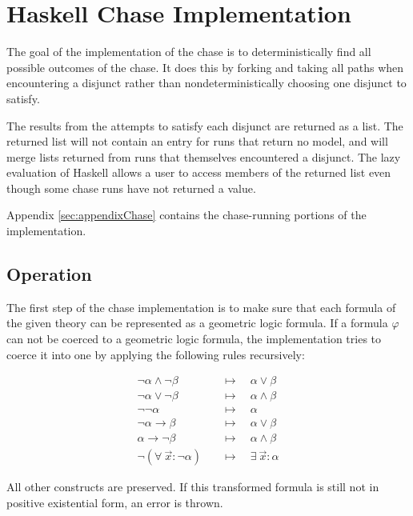 \section{Haskell Chase Implementation}
\label{sec:implementation}

	The goal of the implementation of the chase is to deterministically find
	all possible outcomes of the chase. It does this by forking and taking all
	paths when encountering a disjunct rather than nondeterministically
	choosing one disjunct to satisfy.

	The results from the attempts to satisfy each disjunct are returned as a
	list. The returned list will not contain an entry for runs that return no
	model, and will merge lists returned from runs that themselves encountered
	a disjunct. The lazy evaluation of Haskell allows a user to access members
	of the returned list even though some chase runs have not returned a value.

	Appendix \ref{sec:appendixChase} contains the chase-running portions of the implementation.

	\subsection{Operation}

	The first step of the chase implementation is to make sure that each
	formula of the given theory can be represented as a geometric logic
	formula. If a formula $\varphi$ can not be coerced to a geometric logic
	formula, the implementation tries to coerce it into one by applying the
	following rules recursively:

	\begin{align*}
	\neg\alpha \wedge \neg\beta         \quad & \mapsto \quad \alpha \vee \beta        \\
	\neg\alpha \vee \neg\beta           \quad & \mapsto \quad \alpha \wedge \beta      \\
	\neg\neg\alpha                      \quad & \mapsto \quad \alpha                   \\
	\neg\alpha \to \beta                \quad & \mapsto \quad \alpha \vee \beta        \\
	\alpha \to \neg\beta                \quad & \mapsto \quad \alpha \wedge \beta      \\
	\neg(\forall\ \vec{x} : \neg\alpha) \quad & \mapsto \quad \exists\ \vec{x} : \alpha
	\end{align*}

	All other constructs are preserved. If this transformed formula is still
	not in positive existential form, an error is thrown.

